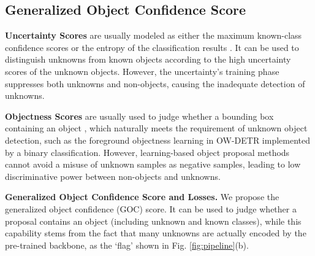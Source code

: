 \documentclass[10pt,twocolumn,letterpaper]{article}
\newcommand{\xf}[1]{{\color{black} #1}}
\newcommand{\MyScore}{Generalized Object Confidence Score\xspace}
\begin{document}
\subsection{\MyScore}
\label{sec:MyScore}

\noindent\textbf{Uncertainty \xf{Scores}} \xf{are} usually modeled as either the maximum known-class conﬁdence \xf{scores} \cite{hendrycks2016baseline,liang2017enhancing} or the entropy of the classification results \cite{liu2020energy, vos, du2022unknown}.
It can be used to distinguish unknowns from known objects according to the high uncertainty \xf{scores} of the unknown objects.
However,
the uncertainty's training phase suppresses both unknowns and non-objects,
causing the inadequate detection of unknowns.



\noindent\textbf{Objectness \xf{Scores}} \xf{are} usually used to judge whether a bounding box containing an object \cite{OLP,edgeboxes,ren2015faster},
which naturally meets the requirement of unknown object detection,
such as the foreground objectness learning in OW-DETR \cite{OWDETR} implemented by a binary classification.
However,
learning-based object proposal methods cannot avoid \xf{a} misuse of unknown samples as negative samples,
leading to low discriminative power between non-objects and unknowns.

\noindent\textbf{Generalized Object Confidence Score and Losses.}
We propose the generalized object confidence (GOC) score.
\xf{It can be used to judge} whether a proposal contains an object (including unknown and known classes),
while this capability stems from the fact that many unknowns are actually encoded by the pre-trained backbone,
as the `flag' shown in Fig. \ref{fig:pipeline}(b).
\end{document}
